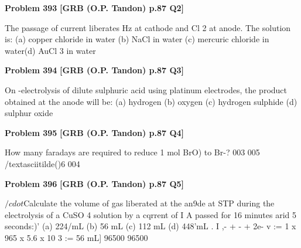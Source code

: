\begin{problembox}
\textbf{Problem 393} \hfill \textbf{[GRB (O.P. Tandon) p.87 Q2]}
\label{q:ext-grb_all_questions-393}

The passage of current liberates Hz at cathode and Cl 2 at 
anode. The solution is: 
(a) copper chloride in water (b) NaCl in water 
(c) mercuric chloride in water(d) AuCl 3 in water
\end{problembox}

\begin{problembox}
\textbf{Problem 394} \hfill \textbf{[GRB (O.P. Tandon) p.87 Q3]}
\label{q:ext-grb_all_questions-394}

On -electrolysis of dilute sulphuric acid using platinum 
electrodes, the product obtained at the anode will be: 
(a) hydrogen 
(b) oxygen 
(c) hydrogen sulphide 
(d) sulphur oxide
\end{problembox}

\begin{problembox}
\textbf{Problem 395} \hfill \textbf{[GRB (O.P. Tandon) p.87 Q4]}
\label{q:ext-grb_all_questions-395}

How many faradays are required to reduce 1 mol BrO) to 
Br-? 
003 
005 
/textasciitilde()6 
004
\end{problembox}

\begin{problembox}
\textbf{Problem 396} \hfill \textbf{[GRB (O.P. Tandon) p.87 Q5]}
\label{q:ext-grb_all_questions-396}

$/cdot$Calculate the volume of gas liberated at the an9de at STP 
during the electrolysis of a CuSO 4 solution by a cqrrent of I A 
passed for 16 minutes arid 5 seconds:)' 
(a) 224/mL 
(b) 56 mL 
(c) 112 mL 
(d) 448'mL 
. 
I 
,-
+ -
+ 2e-
v 
:= 1 x 965 x 5.6 x 10
3 
:= 56 mL] 
96500 
96500
\end{problembox}

